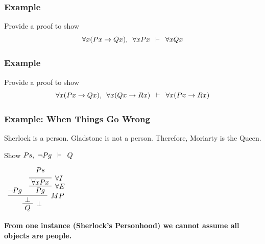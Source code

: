 \documentclass{beamer}
\theoremstyle{indentDefn} \newtheorem{defn}[]{Definition}
\begin{document}
\begin{frame}
	\frametitle{Example}
	
	Provide a proof to show $$\forall x (Px \rightarrow Qx), \hspace{0.5em} \forall x Px \hspace{0.5em} \vdash \hspace{0.5em} \forall x Qx$$
	
	\vspace{7cm}
	
\end{frame}

\begin{frame}
	\frametitle{Example}
	
	Provide a proof to show $$\forall x (Px \rightarrow Qx), \hspace{0.5em} \forall x (Qx \rightarrow Rx) \hspace{0.5em} \vdash \hspace{0.5em} \forall x (Px \rightarrow Rx)$$
	
	
	\vspace{7cm}
	
\end{frame}

\begin{frame}
	\frametitle{Example: When Things Go Wrong}
	
	Sherlock is a person. Gladstone is not a person. Therefore, Moriarty is the Queen.
	
	\vspace{0.5cm}
	
	Show $Ps, \ \lnot Pg \hspace{0.5em} \vdash \hspace{0.5em} Q$
	
	
	\begin{center}
		$\begin{array}{c}
			\infer[\bot]{Q}
				{\infer[MP]{ \ \bot \ }{\lnot Pg & \infer[\forall E]{ \ Pg \ }{\infer[\forall I]{ \ \forall x Px \ }{Ps\vspace{0.2cm}}}}}
		\end{array}$
	\end{center}
	
	\pause
	{\bf From one instance (Sherlock's Personhood) we cannot assume all objects are people.}
	
\end{frame}
\end{document}
